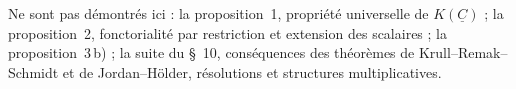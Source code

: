 Ne sont pas démontrés ici : la proposition~1, propriété universelle de $K(\underline C)$ ; la proposition~2, fonctorialité par restriction et extension des scalaires ; la proposition~3\,b) ; la suite du §~10, conséquences des théorèmes de Krull--Remak--Schmidt et de Jordan--Hölder, résolutions et structures multiplicatives.
